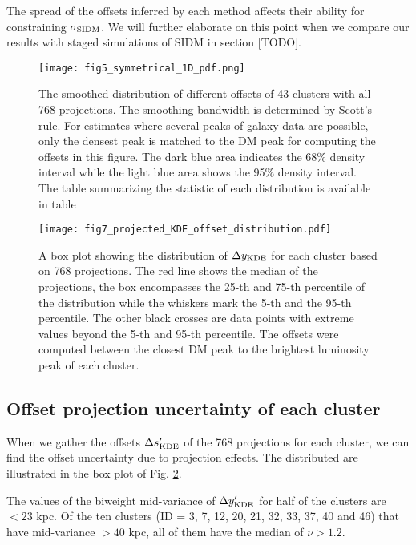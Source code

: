 The spread of the offsets inferred by each method affects their ability
for constraining $\sigma_{\rm SIDM}$. We will further elaborate on this point
when we compare our results with staged simulations of SIDM in section [TODO]. 

\begin{figure*}
	\begin{center}
	\texttt{[image: fig5\_symmetrical\_1D\_pdf.png]}
	\caption{ 		
		The smoothed distribution of different offsets of 43 clusters with all 768
		projections. The smoothing bandwidth is determined by Scott's rule.
		For estimates where several peaks of galaxy data are 
		possible, only the densest peak is matched to the DM peak for computing
		the offsets in this figure. 
		The dark blue area indicates the 68\% density interval
		while the light blue area shows the 95\% density interval. 
		The table summarizing the statistic of each distribution is available in
		table 
		\label{fig:offset_distributions}
	}
\end{center}
\end{figure*}

\begin{figure*}
	\begin{center}
	\texttt{[image: fig7\_projected\_KDE\_offset\_distribution.pdf]}
	\caption{A box plot showing the distribution of $\Delta y_{\rm KDE}$ for each cluster 
		based on 768 projections. The red line shows the median of the projections,
		the box encompasses the 25-th and 75-th percentile of the distribution while
		the whiskers mark the 5-th and the 95-th percentile. The other black crosses
		are data points with extreme values beyond the 5-th and 95-th percentile.
		The offsets were computed between the closest DM 
		peak to the brightest luminosity peak of each cluster. 		
		\label{fig:projected_KDE_offset_distribution}
	}
\end{center}
\end{figure*}

\subsection{Offset projection uncertainty of each cluster}
When we gather the offsets $\Delta s_{\rm KDE}'$ of the 
768 projections for each cluster,
we can find the offset uncertainty due to projection effects.
The distributed are illustrated in the box plot of Fig. 
\ref{fig:projected_KDE_offset_distribution}.


The values of the biweight mid-variance of $\Delta y_{\rm KDE}'$ for half of the clusters
are $< 23$ kpc. Of the ten clusters (ID = 3, 7, 12, 20, 21, 32, 33, 37, 40 and 46) 
that have mid-variance $ > 40$ kpc, all of them have the median of $\nu > 1.2$.
 
